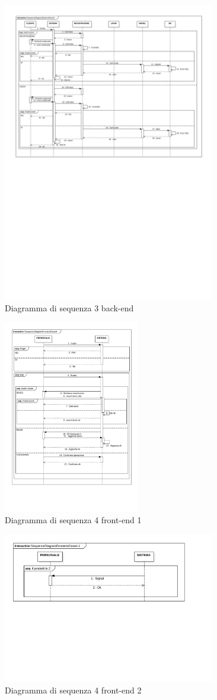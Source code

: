 \documentclass[a4paper,titlepage]{book}
\begin{document}
\begin{figure}[H]
\center
\includegraphics[width=350px]{img/Seq3B.pdf}
\caption{Diagramma di sequenza 3 back-end \label{fig:seq3b}}
\end{figure}
\begin{figure}[H]
\center
\includegraphics[width=225px]{img/Seq4F1.pdf}
\caption{Diagramma di sequenza 4 front-end 1 \label{fig:seq4f1}}
\end{figure}
\begin{figure}[H]
\center
\includegraphics[width=350px]{img/Seq4F2.pdf}
\caption{Diagramma di sequenza 4 front-end  2\label{fig:seq4f2}}
\end{figure}
\end{document}
